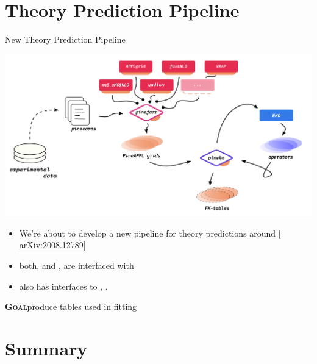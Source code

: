 \documentclass[9pt]{beamer}
\providecommand{\iRef}[1]{{\color{mLightGreen}\small $[$#1$]$}}
\begin{document}
\section{Theory Prediction Pipeline}

\begin{frame}{New Theory Prediction Pipeline}
	\begin{center}
		\includegraphics[width=.8\linewidth]{fk}
	\end{center}

	\begin{itemize}
        \item We're about to develop a new pipeline for theory predictions
            around \pineappl{}
            \iRef{\href{https://arxiv.org/abs/2008.12789}{arXiv:2008.12789}}
		\item both, \eko and \yadism, are interfaced with \pineappl
        \item \pineappl also has interfaces to \madgraph, \appl, \fastnlo
	\end{itemize}

    \vspace*{10pt}
    \textbf{\textsc{Goal}}\quad produce \fk tables used in \pdf fitting
\end{frame}

\section{Summary}
\end{document}
